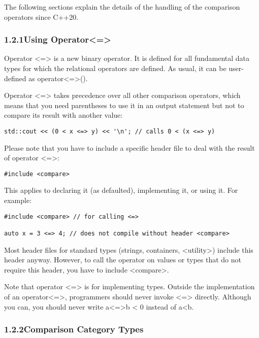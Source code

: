 The following sections explain the details of the handling of the comparison operators since C++20.

\subsubsection*{ 1.2.1\hspace{0.2cm}Using Operator<=>}

Operator <=> is a new binary operator. It is defined for all fundamental data types for which the relational operators are defined. As usual, it can be user-defined as operator<=>().

Operator <=> takes precedence over all other comparison operators, which means that you need parentheses to use it in an output statement but not to compare its result with another value:

\begin{lstlisting}[style=styleCXX]
std::cout << (0 < x <=> y) << '\n'; // calls 0 < (x <=> y)
\end{lstlisting}

Please note that you have to include a specific header file to deal with the result of operator <=>:

\begin{lstlisting}[style=styleCXX]
#include <compare>
\end{lstlisting}

This applies to declaring it (as defaulted), implementing it, or using it. For example:

\begin{lstlisting}[style=styleCXX]
#include <compare> // for calling <=>

auto x = 3 <=> 4; // does not compile without header <compare>
\end{lstlisting}

Most header files for standard types (strings, containers, <utility>) include this header anyway. However, to call the operator on values or types that do not require this header, you have to include <compare>.

Note that operator <=> is for implementing types. Outside the implementation of an operator<=>, programmers should never invoke <=> directly. Although you can, you should never write a<=>b < 0 instead of a<b.

\subsubsection*{ 1.2.2\hspace{0.2cm}Comparison Category Types}

